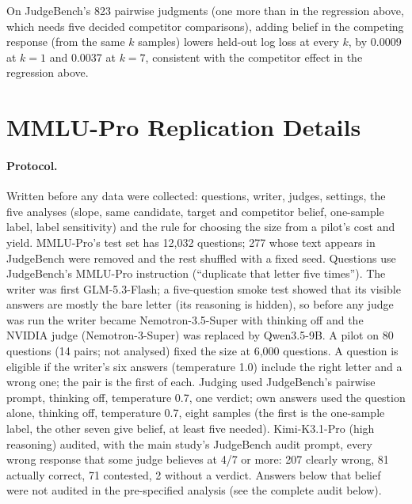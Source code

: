 \documentclass[11pt]{article}
\begin{document}
On JudgeBench's 823 pairwise judgments (one more than in the regression above, which needs five decided
competitor comparisons), adding belief in the competing response (from the same $k$ samples) lowers
held-out log loss at every $k$, by 0.0009 at $k=1$ and 0.0037 at $k=7$, consistent with the competitor effect in
the regression above.

\section{MMLU-Pro Replication Details}
\label{app:replication}
\paragraph{Protocol.} Written before any data were collected: questions, writer, judges, settings, the five analyses (slope, same candidate, target and competitor belief, one-sample label, label sensitivity) and the rule for choosing the size from a pilot's cost and yield. MMLU-Pro's test set has 12,032 questions;
277 whose text appears in JudgeBench were removed and the rest shuffled with a fixed seed. Questions use
JudgeBench's MMLU-Pro instruction (``duplicate that letter five times''). The writer was first GLM-5.3-Flash; a
five-question smoke test showed that its visible answers are mostly the bare letter (its reasoning is hidden), so
before any judge was run the writer became Nemotron-3.5-Super with thinking off and the NVIDIA judge (Nemotron-3-Super) was replaced by
Qwen3.5-9B. A pilot on 80 questions (14 pairs; not analysed) fixed the size at 6,000 questions. A question is
eligible if the writer's six answers (temperature 1.0) include the right letter and a wrong one; the pair is the
first of each. Judging used JudgeBench's pairwise prompt, thinking off, temperature 0.7, one verdict; own answers
used the question alone, thinking off, temperature 0.7, eight samples (the first is the one-sample label, the other
seven give belief, at least five needed). Kimi-K3.1-Pro (high reasoning) audited, with the main study's JudgeBench
audit prompt, every wrong response that some judge believes at 4/7 or more: 207 clearly wrong, 81 actually correct,
71 contested, 2 without a verdict. Answers below that belief were not audited in the pre-specified analysis
(see the complete audit below).
\end{document}
